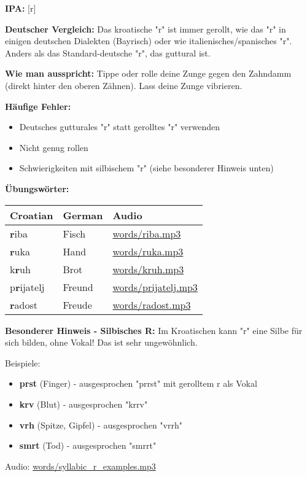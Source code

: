 \begin{tcolorbox}[breakable, colback=lightyellow!30, colframe=orange, title=\textbf{R, r}]

\textbf{IPA:} [r]

\textbf{Deutscher Vergleich:}
Das kroatische "r" ist immer gerollt, wie das "r" in einigen deutschen Dialekten (Bayrisch) oder wie italienisches/spanisches "r". Anders als das Standard-deutsche "r", das guttural ist.

\textbf{Wie man ausspricht:}
Tippe oder rolle deine Zunge gegen den Zahndamm (direkt hinter den oberen Zähnen). Lass deine Zunge vibrieren.

\textbf{Häufige Fehler:}
\begin{itemize}
    \item Deutsches gutturales "r" statt gerolltes "r" verwenden
    \item Nicht genug rollen
    \item Schwierigkeiten mit silbischem "r" (siehe besonderer Hinweis unten)
\end{itemize}

\textbf{Übungswörter:}
\begin{center}
\small
\begin{tabular}{lll}
\textbf{Croatian} & \textbf{German} & \textbf{Audio} \\
\midrule
\textbf{r}iba & Fisch & \small\url{words/riba.mp3} \\
\textbf{r}uka & Hand & \small\url{words/ruka.mp3} \\
k\textbf{r}uh & Brot & \small\url{words/kruh.mp3} \\
p\textbf{r}ijatelj & Freund & \small\url{words/prijatelj.mp3} \\
\textbf{r}adost & Freude & \small\url{words/radost.mp3} \\
\end{tabular}
\end{center}

\textbf{Besonderer Hinweis - Silbisches R:}
Im Kroatischen kann "r" eine Silbe für sich bilden, ohne Vokal! Das ist sehr ungewöhnlich.

Beispiele:
\begin{itemize}
    \item \textbf{prst} (Finger) - ausgesprochen "prrst" mit gerolltem r als Vokal
    \item \textbf{krv} (Blut) - ausgesprochen "krrv"
    \item \textbf{vrh} (Spitze, Gipfel) - ausgesprochen "vrrh"
    \item \textbf{smrt} (Tod) - ausgesprochen "smrrt"
\end{itemize}

Audio: \small\url{words/syllabic\_r\_examples.mp3}

\end{tcolorbox}

